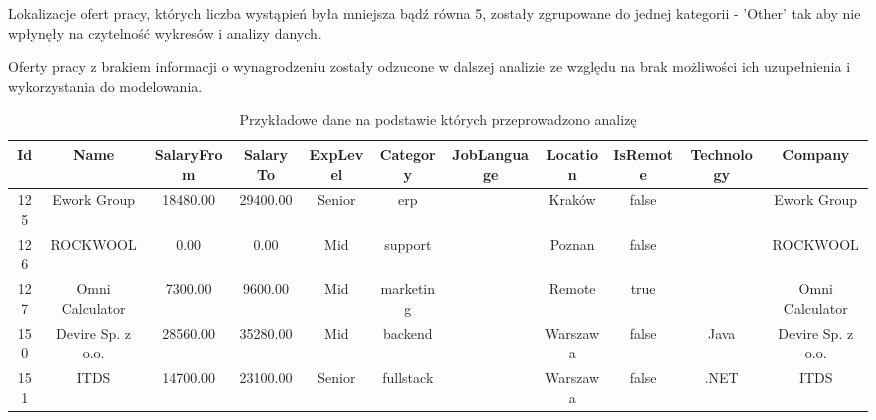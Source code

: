 \documentclass{article}
\begin{document}
Lokalizacje ofert pracy, których liczba wystąpień była mniejsza bądź równa 5, zostały
zgrupowane do jednej kategorii - 'Other' tak aby nie wpłynęły na czytelność wykresów i analizy danych.

Oferty pracy z brakiem informacji o wynagrodzeniu zostały odzucone w dalszej analizie ze względu na brak możliwości ich uzupełnienia i wykorzystania do modelowania.

\begin{table}[H]
    \centering
    \begin{adjustbox}{width=1.1\textwidth}
        \begin{tabular}{|c|c|c|c|c|c|c|c|c|c|c|}
            \hline
            \textbf{Id} & \textbf{Name}     & \textbf{SalaryFrom} & \textbf{SalaryTo} & \textbf{ExpLevel} & \textbf{Category} & \textbf{JobLanguage} & \textbf{Location} & \textbf{IsRemote} & \textbf{Technology} & \textbf{Company}  \\ \hline
            125         & Ework Group       & 18480.00            & 29400.00          & Senior            & erp               &                      & Kraków            & false             &                     & Ework Group       \\ \hline
            126         & ROCKWOOL          & 0.00                & 0.00              & Mid               & support           &                      & Poznan            & false             &                     & ROCKWOOL          \\ \hline
            127         & Omni Calculator   & 7300.00             & 9600.00           & Mid               & marketing         &                      & Remote            & true              &                     & Omni Calculator   \\ \hline
            150         & Devire Sp. z o.o. & 28560.00            & 35280.00          & Mid               & backend           &                      & Warszawa          & false             & Java                & Devire Sp. z o.o. \\ \hline
            151         & ITDS              & 14700.00            & 23100.00          & Senior            & fullstack         &                      & Warszawa          & false             & .NET                & ITDS              \\ \hline
        \end{tabular}
    \end{adjustbox}
    \caption{Przykładowe dane na podstawie których przeprowadzono analizę}
    \label{tab:oferty}
\end{table}
\end{document}
